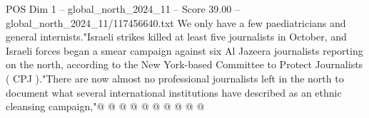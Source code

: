 \begin{textsample}{POS Dim 1 – global\_north\_2024\_11 – Score 39.00 – global\_north\_2024\_11/117456640.txt}
We only have a few paediatricians and general internists."Israeli strikes killed at least five journalists in October, and Israeli forces began a smear campaign against six Al Jazeera journalists reporting on the north, according to the New York-based Committee to Protect Journalists ( CPJ )."There are now almost no professional journalists left in the north to document what several international institutions have described as an ethnic cleansing campaign,"@ @ @ @ @ @ @ @ @ @

\end{textsample}
